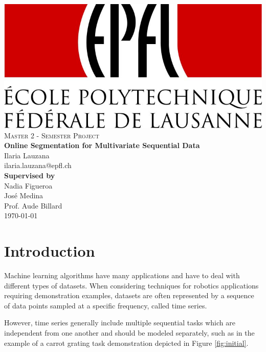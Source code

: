 \documentclass[11pt,twoside,a4paper]{report}
\begin{document}

\begin{titlepage}
\begin{center}
\includegraphics[width=.3\textwidth]{EPFL-Logo.jpg}\\[5pt]
 \vspace{2cm}
\textsc{Master 2 - Semester Project} \\
 \vspace{2cm}
 {\huge\bfseries Online Segmentation for Multivariate Sequential Data \\}
 \vspace{1.5cm}
 {\Large Ilaria Lauzana}\\[5pt]
 ilaria.lauzana@epfl.ch\\[14pt]
 \vspace{2cm}
{\large \bfseries Supervised by} \\[5pt]
{\large Nadia Figueroa}\\[5pt]
{\large Jos\'e Medina}\\[5pt]
{\large Prof. Aude Billard}\\[5pt]
\vfill
\today
\end{center}
\end{titlepage}

\clearpage

\tableofcontents

\newpage

\chapter{Introduction} \label{ch:intro}

Machine learning algorithms have many applications and have to deal with different types of datasets. When considering techniques for robotics applications requiring demonstration examples, datasets are often represented by a sequence of data points sampled at a specific frequency, called time series.

However, time series generally include multiple sequential tasks which are independent from one another and should be modeled separately, such as in the example of a carrot grating task demonstration depicted in Figure \ref{fig:initial}.
\end{document}
